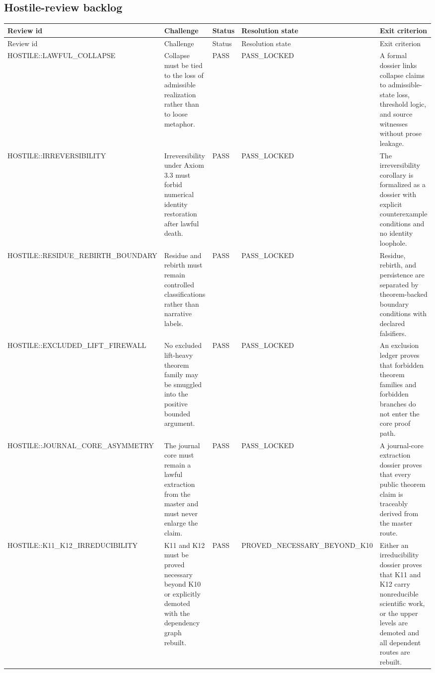 \subsection{Hostile-review backlog}
\begin{longtable}{p{}p{}p{}p{}p{}}
\toprule
Review id & Challenge & Status & Resolution state & Exit criterion \\
\midrule
\endfirsthead
\toprule
Review id & Challenge & Status & Resolution state & Exit criterion \\
\midrule
\endhead
HOSTILE::LAWFUL\_COLLAPSE & Collapse must be tied to the loss of admissible realization rather than to loose metaphor. & PASS & PASS\_LOCKED & A formal dossier links collapse claims to admissible-state loss, threshold logic, and source witnesses without prose leakage. \\
HOSTILE::IRREVERSIBILITY & Irreversibility under Axiom 3.3 must forbid numerical identity restoration after lawful death. & PASS & PASS\_LOCKED & The irreversibility corollary is formalized as a dossier with explicit counterexample conditions and no identity loophole. \\
HOSTILE::RESIDUE\_REBIRTH\_BOUNDARY & Residue and rebirth must remain controlled classifications rather than narrative labels. & PASS & PASS\_LOCKED & Residue, rebirth, and persistence are separated by theorem-backed boundary conditions with declared falsifiers. \\
HOSTILE::EXCLUDED\_LIFT\_FIREWALL & No excluded lift-heavy theorem family may be smuggled into the positive bounded argument. & PASS & PASS\_LOCKED & An exclusion ledger proves that forbidden theorem families and forbidden branches do not enter the core proof path. \\
HOSTILE::JOURNAL\_CORE\_ASYMMETRY & The journal core must remain a lawful extraction from the master and must never enlarge the claim. & PASS & PASS\_LOCKED & A journal-core extraction dossier proves that every public theorem claim is traceably derived from the master route. \\
HOSTILE::K11\_K12\_IRREDUCIBILITY & K11 and K12 must be proved necessary beyond K10 or explicitly demoted with the dependency graph rebuilt. & PASS & PROVED\_NECESSARY\_BEYOND\_K10 & Either an irreducibility dossier proves that K11 and K12 carry nonreducible scientific work, or the upper levels are demoted and all dependent routes are rebuilt. \\
\bottomrule
\end{longtable}

